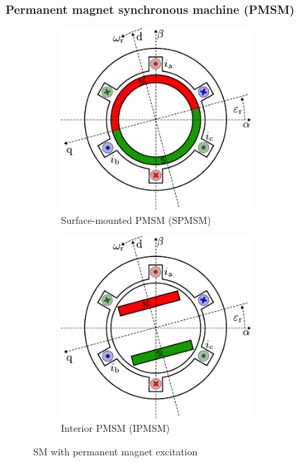 \begin{frame}
	\frametitle{Permanent magnet synchronous machine (PMSM)}
	\begin{figure}
		\centering
		\begin{subfigure}{0.49\textwidth}
			\centering
			\includegraphics[width=0.8\textwidth]{fig/lec07/SPMSM.pdf}
			\caption{Surface-mounted PMSM (SPMSM)}
		\end{subfigure}
		\hfill
		\begin{subfigure}{0.49\textwidth}
			\centering
			\includegraphics[width=0.8\textwidth]{fig/lec07/IPMSM.pdf}
			\caption{Interior PMSM (IPMSM)}
		\end{subfigure}
        \caption{SM with permanent magnet excitation} 
        \label{fig:PMSMs}
	\end{figure}
\end{frame}

